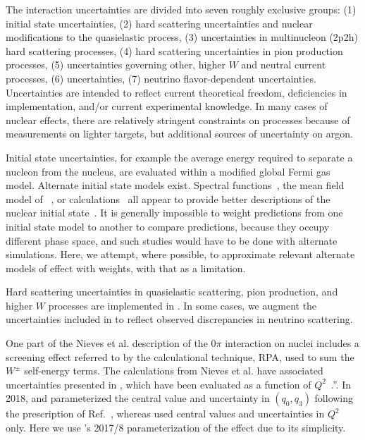 The interaction uncertainties are divided into seven roughly exclusive groups: (1) initial state uncertainties, (2) hard scattering uncertainties and nuclear modifications to the quasielastic process, (3) uncertainties in multinucleon (2p2h) hard scattering processes, (4) hard scattering uncertainties in pion production processes, (5) uncertainties governing other, higher $W$ and neutral current processes, (6)  uncertainties, (7) neutrino flavor-dependent uncertainties. Uncertainties are intended to reflect current theoretical freedom, deficiencies in implementation, and/or current experimental knowledge.  In many cases of nuclear effects, there are relatively stringent constraints on processes because of measurements on lighter targets, but additional sources of uncertainty on argon. 


Initial state uncertainties, for example the average energy required to separate a nucleon from the nucleus, are evaluated within a modified global Fermi gas model.  Alternate initial state models exist. Spectral functions~\cite{Benhar:1994hw,Nieves:2004wx}, the mean field model of ~\cite{Gallmeister:2016dnq}, or  calculations~\cite{Pandey:2014tza} all appear to  provide better descriptions of the nuclear initial state~\cite{Sobczyk:2017mts}.   It is generally impossible to weight predictions from one initial state model to another to compare predictions, because they occupy different phase space, and such studies would have to be done with alternate  simulations. Here, we attempt, where possible, to approximate relevant alternate models of effect with weights, with that as a limitation.

Hard scattering uncertainties in quasielastic scattering,  pion production, and higher $W$ processes are implemented in .  In some cases, we augment the uncertainties included in  to reflect observed discrepancies in neutrino scattering.

One part of the Nieves et al.\cite{nieves1,nieves2} description of the $0\pi$ interaction on nuclei includes a screening effect referred to by the calculational technique, RPA, used to sum the $W^\pm$ self-energy terms. 
The calculations from Nieves et al. have associated uncertainties presented in \cite{nieves_uncert}, which have been evaluated as a function of $Q^2$~\cite{sanchez-private}.”.
 In 2018,  and  parameterized the central value and uncertainty in $(q_0, q_3)$ following the prescription of Ref.~\cite{RikRPA}, whereas  used central values and uncertainties in $Q^2$ only. Here we use 's 2017/8 parameterization of the  effect\cite{t2k_2018} due to its simplicity.

